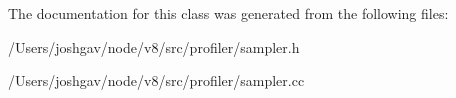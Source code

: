 The documentation for this class was generated from the following files\+:\begin{DoxyCompactItemize}
\item 
/\+Users/joshgav/node/v8/src/profiler/sampler.\+h\item 
/\+Users/joshgav/node/v8/src/profiler/sampler.\+cc\end{DoxyCompactItemize}
